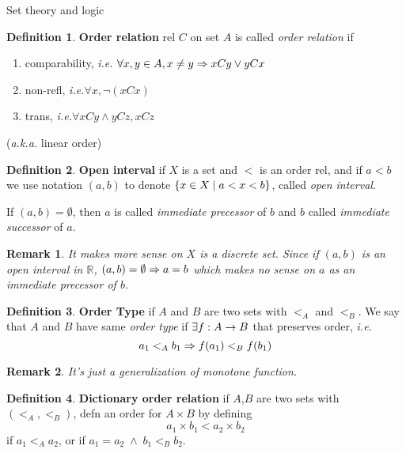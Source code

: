 \documentclass{report}
\newtheorem*{remark}{Remark}
\theoremstyle{definition}
\newtheorem{definition}{Definition}[chapter]
\newcommand{\defn}[1]{\textbf{#1}\label{#1}}
\newcommand{\set}[1]{\ensuremath\{#1\}}
\newcommand{\ie}{\textit{i.e.}\xspace}
\newcommand{\aka}{\textit{a.k.a.}\xspace}
\newcommand{\RA}{\ensuremath\Rightarrow}
\newcommand{\RR}{\mathbb{R}}
\newcommand{\A}{$A$\xspace}
\newcommand{\B}{$B$\xspace}
\newcommand{\ex}{\ensuremath\exists}
\begin{document}
\begin{chapter}{Set theory and logic}
  \begin{definition}{\defn{Order relation}}
    rel $C$ on set $A$ is called \emph{order relation} if
    \begin{enumerate}
    \item comparability, \ie
      $\forall x,y\in A, x\not=y\RA x C y\lor y C x$
    \item non-refl, \ie $\forall x, \neg(x C x)$
    \item trans, \ie $\forall x C y\land y C z, x C z$
    \end{enumerate}
    (\aka linear order)
  \end{definition}

  \begin{definition}{\defn{Open interval}}
    if $X$ is a set and $<$ is an order rel, and if $a<b$ we use
    notation $(a,b)$ to denote $\set{x\in X\mid a<x<b}$, called
    \emph{open interval}.

    If $(a,b) = \emptyset$, then $a$ is called \emph{immediate
      precessor} of $b$ and $b$ called \emph{immediate successor} of
    $a$.
  \end{definition}
  \begin{remark}
    It makes more sense on $X$ is a discrete set. Since if
    $(a,b)$ is an open interval in $\RR$, $(a,b) = \emptyset
    \RA a = b$ which makes no sense on $a$ as an immediate precessor
    of $b$.
  \end{remark}

  \begin{definition}{\defn{Order Type}}
    if $A$ and $B$ are two sets with $<_A$ and $<_B$. We say that \A
    and \B have same \emph{order type} if $\ex f : A \to B$ that
    preserves order, \ie $$a_1 <_A b_1 \RA f(a_1) <_B f(b_1)$$
  \end{definition}
  \begin{remark}
    It's just a generalization of monotone function.
  \end{remark}

  \begin{definition}{\defn{Dictionary order relation}}
    if \A,\B are two sets with $(<_A,<_B)$, defn an order for
    $A\times B$ by defining $$a_1\times b_1 < a_2\times b_2$$
    if $a_1<_A a_2$, or if $a_1=a_2\;\land\;b_1<_B b_2$.
  \end{definition}


\end{chapter}
\end{document}
